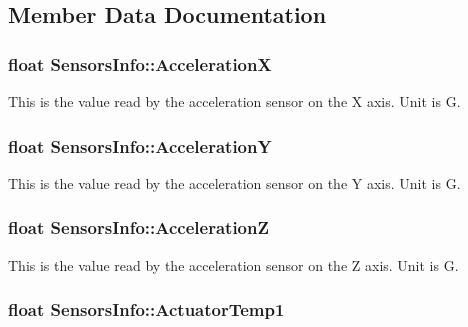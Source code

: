 \subsection{Member Data Documentation}
\subsubsection[{\texorpdfstring{AccelerationX}{AccelerationX}}]{\setlength{\rightskip}{0pt plus 5cm}float Sensors\+Info\+::\+AccelerationX}\hypertarget{structSensorsInfo_a3d4a04448cbb350ce537758ec9c38e51}{}\label{structSensorsInfo_a3d4a04448cbb350ce537758ec9c38e51}


This is the value read by the acceleration sensor on the X axis. Unit is G. 

\subsubsection[{\texorpdfstring{AccelerationY}{AccelerationY}}]{\setlength{\rightskip}{0pt plus 5cm}float Sensors\+Info\+::\+AccelerationY}\hypertarget{structSensorsInfo_af8316a86022a11ef16181d5cbc6e266e}{}\label{structSensorsInfo_af8316a86022a11ef16181d5cbc6e266e}


This is the value read by the acceleration sensor on the Y axis. Unit is G. 

\subsubsection[{\texorpdfstring{AccelerationZ}{AccelerationZ}}]{\setlength{\rightskip}{0pt plus 5cm}float Sensors\+Info\+::\+AccelerationZ}\hypertarget{structSensorsInfo_a98074de49d42dbb1b303e5e68e03cc90}{}\label{structSensorsInfo_a98074de49d42dbb1b303e5e68e03cc90}


This is the value read by the acceleration sensor on the Z axis. Unit is G. 

\subsubsection[{\texorpdfstring{Actuator\+Temp1}{ActuatorTemp1}}]{\setlength{\rightskip}{0pt plus 5cm}float Sensors\+Info\+::\+Actuator\+Temp1}\hypertarget{structSensorsInfo_a9aa0da9e61455fd8b3faa91ad5970985}{}\label{structSensorsInfo_a9aa0da9e61455fd8b3faa91ad5970985}


